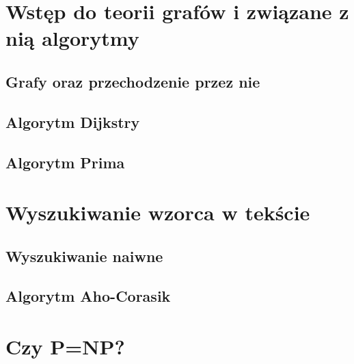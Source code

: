 \documentclass[10pt, oneside]{article}
\theoremstyle{remark}
\begin{document}
\section{Wstęp do teorii grafów i związane z nią algorytmy}
\subsection{Grafy oraz przechodzenie przez nie}
\subsection{Algorytm Dijkstry}
\subsection{Algorytm Prima}

\section{Wyszukiwanie wzorca w tekście}

\subsection{Wyszukiwanie naiwne}

\subsection{Algorytm Aho-Corasik}

\section{Czy P=NP?}
\end{document}
